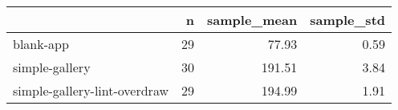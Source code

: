 \begin{tabular}{lrrr}
\toprule
{} &   n &  sample\_mean &  sample\_std \\
\midrule
blank-app                    &  29 &        77.93 &        0.59 \\
simple-gallery               &  30 &       191.51 &        3.84 \\
simple-gallery-lint-overdraw &  29 &       194.99 &        1.91 \\
\bottomrule
\end{tabular}
